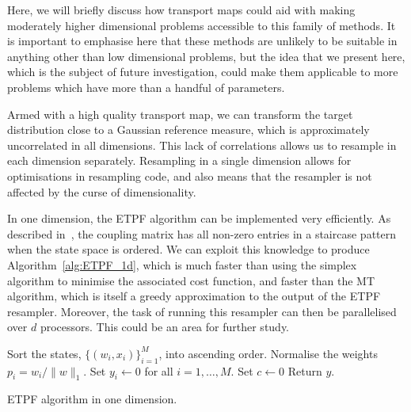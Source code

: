 \documentclass[final]{siamltex}
\begin{document}
Here, we will briefly discuss how transport maps could aid
with making moderately higher dimensional problems accessible to this
family of methods. It is important to emphasise here that these
methods are unlikely to be suitable in anything other than low
dimensional problems, but the idea that we present here, which is the
subject of future investigation, could make them applicable to more
problems which have more than a handful of parameters.

Armed with a high quality transport map, we can transform the target
distribution close to a Gaussian reference measure, which is
approximately uncorrelated in all dimensions. This lack of correlations allows us to
resample in each dimension separately. Resampling in a
single dimension allows for optimisations in resampling code, and also
means that the resampler is not affected by the curse of
dimensionality. 

In one
dimension, the ETPF algorithm can be implemented very efficiently. As
described in~\cite{reich2013nonparametric}, the coupling matrix has
all non-zero entries in a staircase pattern when the state space is
ordered. We can exploit this knowledge to produce
Algorithm~\ref{alg:ETPF_1d}, which is much faster than using the
simplex algorithm to minimise the associated cost function, and faster
than the MT algorithm\cite{cotter2015parallel}, which is itself a
greedy approximation to the output of the ETPF resampler. Moreover, the task of
running this resampler can then be parallelised over $d$
processors. This could be an area for further study.

\begin{table}[!htpb]
\begin{algorithm}[H]
\DontPrintSemicolon
\BlankLine
Sort the states, $\{(w_i, x_i)\}_{i=1}^M$, into ascending order.\;
Normalise the weights $p_i = w_i/\|w\|_1$.\;
Set $y_i \leftarrow 0$ for all $i=1,\dots,M$.\;
Set $c \leftarrow 0$\;
Return $y$.\;
\caption{ETPF algorithm in one dimension.\label{alg:ETPF_1d}}
\end{algorithm}
\end{table}

\end{document}
